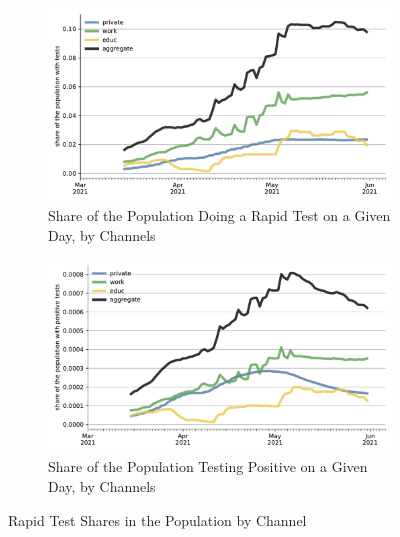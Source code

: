 \begin{figure}[ht] %
    \centering
    \begin{subfigure}[b]{0.49\textwidth}
        \includegraphics[width=\textwidth]{figures/results/figures/rapid_test_statistics/popshare_tested}
        \caption{Share of the Population Doing a Rapid Test on a Given Day, by Channels}
        \label{fig:rapid_test_demand_by_channel}
    \end{subfigure}
    \hfill
    \begin{subfigure}[b]{0.49\textwidth}
        \includegraphics[width=\textwidth]{figures/results/figures/rapid_test_statistics/popshare_tested_positive}
        \caption{Share of the Population Testing Positive on a Given Day, by Channels}
        \label{fig:pos_rapid_tests_by_channel}
    \end{subfigure}
    \caption{Rapid Test Shares in the Population by Channel}
\end{figure}
